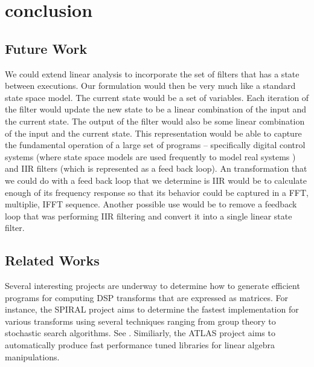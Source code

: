 \section{conclusion}




\subsection{Future Work}
We could extend linear analysis to incorporate the set of filters
that has a state between executions. Our formulation would then be very
much like a standard state space model. The current state would be a set of
variables. Each iteration of the filter would update the new state to be
a linear combination of the input and the current state. The output of the 
filter would also be some linear combination of the input and the current state.
This representation would be able to capture the fundamental operation of
a large set of programs -- specifically digital control systems (where state
space models are used frequently to model real systems ) and IIR filters (which
is represented as a feed back loop). An transformation that we could do with 
a feed back loop that we determine is IIR would be to calculate enough of its
frequency response so that its behavior could be captured in a FFT, multiplie,
IFFT sequence. Another possible use would be to remove a feedback loop that was
performing IIR filtering and convert it into a single linear state filter.  




\subsection{Related Works}
Several interesting projects are underway to determine how to generate efficient programs
for computing DSP transforms that are expressed as matrices. For instance, the SPIRAL
project\cite{spiral} aims to determine the fastest implementation for various transforms
using several techniques ranging from group theory to stochastic search algorithms. See
 \cite{xiong-thesis,xiong01spl,johnson01searching,egner01automatic}.
Similiarly, the ATLAS project \cite{whaley01automated} aims to automatically produce fast
performance tuned libraries for linear algebra manipulations.

